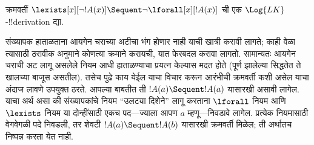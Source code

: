 \documentclass[../../../include/open-logic-section]{subfiles}
\begin{document}


\begin{ex}
क्रमवर्ती $\lexists[x][\lnot !A(x)]
\Sequent \lnot \lforall[x][!A(x)]$ ची एक $\Log{LK}$-!!{derivation} द्या.

संख्यापक हाताळताना आयगेन चराच्या अटीचा भंग होणार नाही याची खात्री करावी
लागते; काही वेळा त्यासाठी ठरावीक अनुमाने कोणत्या क्रमाने करायची, यात फेरबदल
करावा लागतो. सामान्यतः आयगेन चराची अट लागू असलेले नियम आधी हाताळण्याचा
प्रयत्न केल्यास मदत होते (पूर्ण झालेल्या सिद्धतेत ते खालच्या बाजूस असतील).
तसेच पुढे काय येईल याचा विचार करून आरंभीची क्रमवर्ती कशी असेल याचा अंदाज
लावणे उपयुक्त ठरते. आपल्या बाबतीत ती $!A(a) \Sequent !A(a)$ यासारखी असावी
लागेल. याचा अर्थ असा की संख्यापकांचे नियम ``उलट्या दिशेने'' लागू करताना
$\lforall$ नियम आणि $\lexists$ नियम या दोन्हींसाठी एकच पद---ज्याला आपण $a$
म्हणू---निवडावे लागेल. प्रत्येक नियमासाठी वेगवेगळी पदे निवडली, तर शेवटी
$!A(a) \Sequent !A(b)$ यासारखी क्रमवर्ती मिळेल; ती अर्थातच निष्पन्न करता
येत नाही.


\end{ex}
\end{document}
